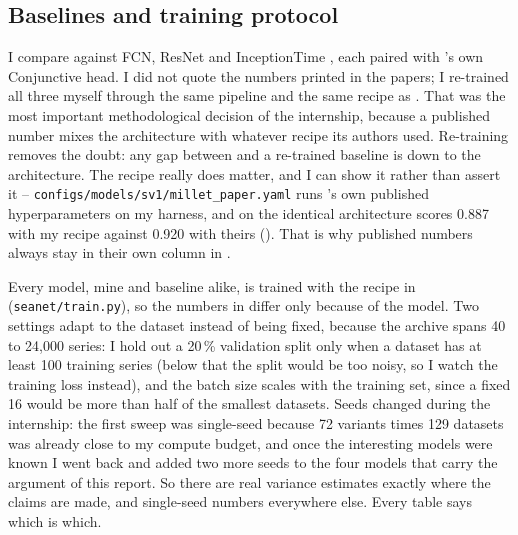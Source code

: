 \subsection{Baselines and training protocol}
\label{sec:setup:baselines}

I compare against FCN, ResNet \citep{wang2017fcn} and InceptionTime \citep{fawaz2020inceptiontime},
each paired with \millet{}'s own Conjunctive head. I did not quote the numbers printed in the
papers; I re-trained all three myself through the same pipeline and the same recipe as \seanet{}.
That was the most important methodological decision of the internship, because a published number
mixes the architecture with whatever recipe its authors used. Re-training removes the doubt: any gap
between \seanet{} and a re-trained baseline is down to the architecture. The recipe really does
matter, and I can show it rather than assert it -- \texttt{configs/models/sv1/millet\_paper.yaml}
runs \millet{}'s own published hyperparameters on my harness, and on \webtraffic{} the identical
architecture scores 0.887 with my recipe against 0.920 with theirs (). That
is why published \millet{} numbers always stay in their own column in .

\label{sec:setup:protocol}
Every model, mine and baseline alike, is trained with the recipe in 
(\texttt{seanet/train.py}), so the numbers in  differ only because of the model.
Two settings adapt to the dataset instead of being fixed, because the \ucr{} archive spans 40 to
24{,}000 series: I hold out a 20\,\% validation split only when a dataset has at least 100 training
series (below that the split would be too noisy, so I watch the training loss instead), and the
batch size scales with the training set, since a fixed 16 would be more than half of the smallest
\ucr{} datasets. Seeds changed during the internship: the first sweep was single-seed because 72
variants times 129 datasets was already close to my compute budget, and once the interesting models
were known I went back and added two more seeds to the four models that carry the argument of this
report. So there are real variance estimates exactly where the claims are made, and single-seed
numbers everywhere else. Every table says which is which.

